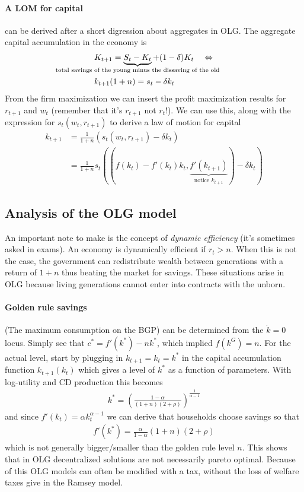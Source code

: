 \documentclass[12pt, a4paper]{article}
\begin{document}
\begin{spacing}{1.213}
\paragraph{A LOM for capital} can be derived after a short digression about aggregates in OLG. The aggregate capital accumulation in the economy is 
\begin{align*}
&K_{t+1} = \underbrace{S_t -K_t}_{\mathclap{\textrm{total savings of the young minus the dissaving of the old}}} + (1-\delta)K_t && \Leftrightarrow \\
& k_{t+1}(1+n) = s_t - \delta k_t
\end{align*}
From the firm maximization we can insert the profit maximization results for $r_{t+1}$ and $w_t$ (remember that it's $r_{t+1}$ not $r_t$!). We can use this, along with the expression for $s_t(w_t, r_{t+1})$ to derive a law of motion for capital
\begin{align*}
k_{t+1} &= \frac{1}{1+n} (s_t(w_t, r_{t+1}) - \delta k_t ) \\
& = \frac{1}{1+n} s_t((f(k_t)-f'(k_t)k_t, \underbrace{f'(k_{t+1})}_{\textrm{notice }k_{t+1}} ) - \delta k_t )
\end{align*}

\subsection{Analysis of the OLG model}
An important note to make is the concept of \textit{dynamic efficiency} (it's sometimes asked in exams). An economy is dynamically efficient if $r_t >n$. When this is not the case, the government can redistribute wealth between generations with a return of $1+n$ thus beating the market for savings. These situations arise in OLG because living generations cannot enter into contracts with the unborn.
\paragraph{Golden rule savings} (The maximum consumption on the BGP) can be determined from the $\dot{k}=0$ locus. Simply see that $c^* = f'(k^*)-nk^*$, which implied $f(k^G) = n$. For the actual level, start by plugging in $k_{t+1} = k_t = k^*$ in the capital accumulation function $k_{t+1} (k_t)$ which gives a level of $k^*$ as a function of parameters. With log-utility and CD production this becomes 
\begin{align*}
k^* = \left(\frac{1-\alpha}{(1+n)(2+ \rho)}\right)^{\frac{1}{\alpha-1}}
\end{align*}
and since $f'(k_t) = \alpha k_t ^{\alpha-1}$ we can derive that households choose savings so that 
\begin{align*}
f'(k^*) = \frac{\alpha}{1-\alpha}(1+n)(2+\rho)
\end{align*}
which is not generally bigger/smaller than the golden rule level $n$. This shows that in OLG decentralized solutions are not necessarily pareto optimal. Because of this OLG models can often be modified with a tax, without the loss of welfare taxes give in the Ramsey model.



\end{spacing}
\end{document}
